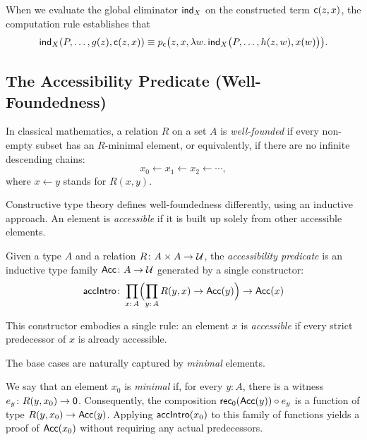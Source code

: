 \begin{rem}
    When we evaluate the global eliminator $\mathsf{ind}_X$ on the constructed term $\mathsf{c}(z,x)$, the computation rule establishes that
    \[
        \mathsf{ind}_X(P,\dots,g(z),\mathsf{c}(z,x))
            \equiv p_{\mathsf{c}}
                \bigl(
                    z,
                    x,
                    \lambda w.\,\mathsf{ind}_X
                        \bigl(
                            P,
                            \dots,
                            h(z,w),
                            x(w)
                        \bigr)
                \bigr).
     \]
\end{rem}

\subsection*{The Accessibility Predicate (Well-Foundedness)}

In classical mathematics, a relation $R$ on a set $A$ is \textsl{well-founded} if every non-empty subset has an $R$-minimal element, or equivalently, if there are no infinite descending chains:
\[
    x_0\leftarrow x_1\leftarrow x_2\leftarrow\cdots,
\]
where $x\leftarrow y$ stands for $R(x,y)$.

Constructive type theory defines well-foundedness differently, using an inductive approach. An element is \textsl{accessible} if it is built up solely from other accessible elements.

\begin{defn}
    Given a type $A$ and a relation $R\colon A\times A\to\univ$, the \textsl{accessibility predicate} is an inductive type family $\fun{Acc}\colon A\to\univ$ generated by a single constructor:
    \[
       \fun{accIntro}\colon\prod_{x\colon A}
        \Bigl(
            \prod_{y\colon A}R(y,x)\to\fun{Acc}(y)
        \Bigr)
        \to\fun{Acc}(x)
    \]
\end{defn}

This constructor embodies a single rule: an element $x$ is \textsl{accessible} if every strict predecessor of $x$ is already accessible.

\begin{rem}
    The base cases are naturally captured by \textsl{minimal} elements.
    
    We say that an element $x_0$ is \textsl{minimal} if, for every $y\colon A$, there is a witness $e_y\colon R(y,x_0)\to\fun0$. Consequently, the composition $\mathsf{rec}_{\mathsf{0}}(\mathsf{Acc}(y))\circ e_y$ is a function of type $R(y,x_0)\to\mathsf{Acc}(y)$. Applying $\mathsf{accIntro}(x_0)$ to this family of functions yields a proof of $\mathsf{Acc}(x_0)$ without requiring any actual predecessors.
\end{rem}


